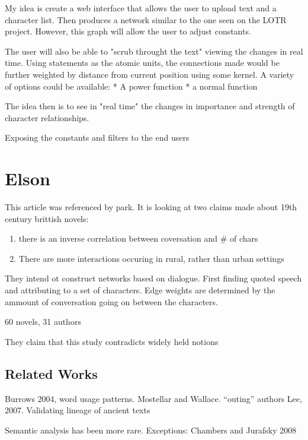 \documentclass{report}\usepackage[]{graphicx}\usepackage[]{color}
\begin{document}
My idea is create a web interface that allows the user to upload text and a character list. Then produces a network similar to the one seen on the LOTR project. However, this graph will allow the user to adjust constants.

The user will also be able to "scrub throught the text" viewing the changes in real time. Using statements as the atomic units, the connections made would be further weighted by distance from current position using some kernel. A variety of options could be available:
* A power function
* a normal function

The idea then is to see in "real time" the changes in importance and strength of character relationships.

Exposing the constants and filters to the end users

\section{Elson}
\date{January 27, 2014}

This article was referenced by park. It is looking at two claims made
about 19th century brittish novels:

\begin{enumerate}
\item
  there is an inverse correlation between coversation and \# of chars
\item
  There are more interactions occuring in rural, rather than urban settings
  
\end{enumerate}

They intend ot construct networks based on dialogue. First finding
quoted speech and attributing to a set of characters. Edge weights are
determined by the ammount of conversation going on between the
characters.

60 novels, 31 authors

They claim that this study contradicts widely held notions

\subsection{Related Works}

Burrows 2004, word usage patterns. Mostellar and Wallace. ``outing''
authors Lee, 2007. Validating lineage of ancient texts

Semantic analysis has been more rare. Exceptions: Chambers and Jurafsky
2008
\end{document}
